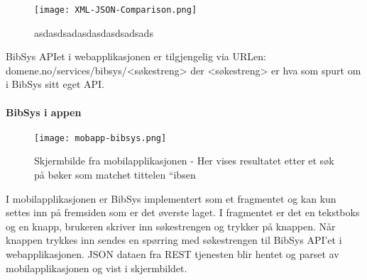 \documentclass[../main.tex]{subfiles}
\begin{document}
\begin{figure}[H]
  \centering
  \texttt{[image: XML-JSON-Comparison.png]}
  \caption{asdasdsadasdasdasdsadsads}
\end{figure}

BibSys APIet i webapplikasjonen er tilgjengelig via URLen: domene.no/services/bibsys/<søkestreng> der <søkestreng> er hva som spurt om i BibSys sitt eget API.

\paragraph{BibSys i appen}

\begin{figure}[H]
  \centering
  \texttt{[image: mobapp-bibsys.png]}
  \caption{Skjermbilde fra mobilapplikasjonen - Her vises resultatet etter et søk på bøker som matchet tittelen “ibsen}
\end{figure}

I mobilapplikasjonen er BibSys implementert som et fragmentet og kan kun settes inn på fremsiden som er det øverste laget. I fragmentet er det en tekstboks og en knapp, brukeren skriver inn søkestrengen og trykker på knappen. Når knappen trykkes inn sendes en spørring med søkestrengen til BibSys API’et i webapplikasjonen. JSON dataen fra REST tjenesten blir hentet og parset av mobilapplikasjonen og vist i skjermbildet.

\newpage
\end{document}
